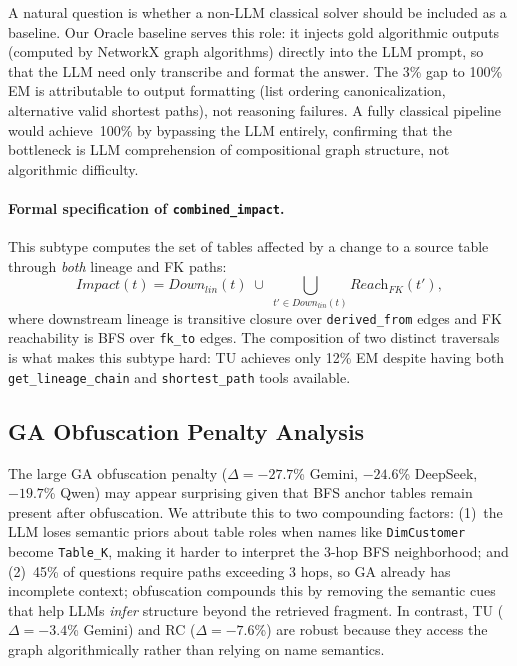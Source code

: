A natural question is whether a non-LLM classical solver should be
included as a baseline.  Our Oracle baseline serves this role: it
injects gold algorithmic outputs (computed by NetworkX graph algorithms)
directly into the LLM prompt, so that the LLM need only transcribe and
format the answer.  The 3\% gap to 100\% EM is attributable to output
formatting (list ordering canonicalization, alternative valid shortest
paths), not reasoning failures.  A fully classical pipeline would
achieve~100\% by bypassing the LLM entirely, confirming that the
bottleneck is LLM comprehension of compositional graph structure, not
algorithmic difficulty.

\paragraph{Formal specification of \texttt{combined\_impact}.}
This subtype computes the set of tables affected by a change to a source
table through \emph{both} lineage and FK paths:
\[
\textit{Impact}(t) = \textit{Down}_{\textit{lin}}(t)
\;\cup\; \bigcup_{t' \in \textit{Down}_{\textit{lin}}(t)}
\textit{Reach}_{\textit{FK}}(t'),
\]
where downstream lineage is transitive closure over \texttt{derived\_from}
edges and FK reachability is BFS over \texttt{fk\_to} edges.  The
composition of two distinct traversals is what makes this subtype hard:
TU achieves only 12\% EM despite having both \texttt{get\_lineage\_chain}
and \texttt{shortest\_path} tools available.

\subsection{GA Obfuscation Penalty Analysis}

The large GA obfuscation penalty ($\Delta{=}{-}27.7$\% Gemini,
${-}24.6$\% DeepSeek, ${-}19.7$\% Qwen) may appear surprising given that BFS anchor tables
remain present after obfuscation.  We attribute this to two compounding
factors: (1)~the LLM loses semantic priors about table roles when
names like \texttt{DimCustomer} become \texttt{Table\_K}, making it
harder to interpret the 3-hop BFS neighborhood; and (2)~45\% of
questions require paths exceeding 3 hops, so GA already has incomplete
context; obfuscation compounds this by removing the semantic cues that
help LLMs \emph{infer} structure beyond the retrieved fragment.
In contrast, TU ($\Delta{=}{-}3.4$\% Gemini) and RC ($\Delta{=}{-}7.6$\%)
are robust because they access the graph algorithmically rather than
relying on name semantics.

